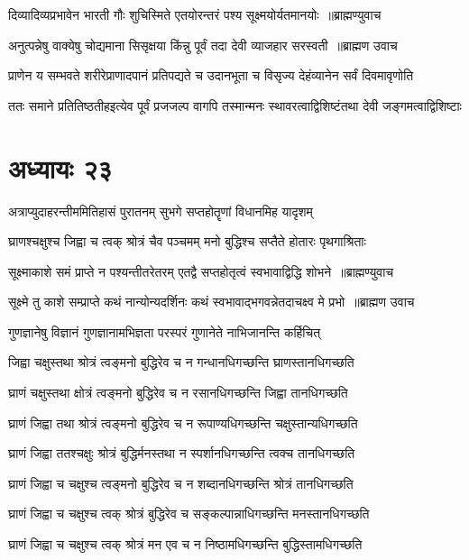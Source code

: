 \threelineshloka
{दिव्यादिव्यप्रभावेन भारती गौः शुचिस्मिते}
{एतयोरन्तरं पश्य सूक्ष्मयोर्यतमानयोः ॥ब्राह्मण्युवाच}
{}


\threelineshloka
{अनुत्पन्नेषु वाक्येषु चोद्यमाना सिसृक्षया}
{किंन्नु पूर्वं तदा देवी व्याजहार सरस्वती ॥ब्राह्मण उवाच}
{}


\twolineshloka
{प्राणेन य सम्भवते शरीरेप्राणादपानं प्रतिपद्यते च}
{उदानभूता च विसृज्य देहंव्यानेन सर्वं दिवमावृणोति}


\twolineshloka
{ततः समाने प्रतितिष्ठतीहइत्येव पूर्वं प्रजजल्प वागपि}
{तस्मान्मनः स्थावरत्वाद्विशिष्टंतथा देवी जङ्गमत्वाद्विशिष्टाः}


\chapter{अध्यायः २३}
\twolineshloka
{अत्राप्युदाहरन्तीममितिहासं पुरातनम्}
{सुभगे सप्तहोतॄणां विधानमिह यादृशम्}


\twolineshloka
{घ्राणश्चक्षुश्च जिह्वा च त्वक् श्रोत्रं चैव पञ्चमम्}
{मनो बुद्धिश्च सप्तैते होतारः पृथगाश्रिताः}


\threelineshloka
{सूक्ष्माकाशे समं प्राप्ते न पश्यन्तीतरेतरम्}
{एतद्वै सप्तहोतृत्वं स्वभावाद्विद्धि शोभने ॥ब्राह्मण्युवाच}
{}


\threelineshloka
{सूक्ष्मे तु काशे सम्प्राप्ते कथं नान्योन्यदर्शिनः}
{कथं स्वभावाद्भगवन्नेतदाचक्ष्व मे प्रभो ॥ब्राह्मण उवाच}
{}


\twolineshloka
{गुणज्ञानेषु विज्ञानं गुणज्ञानामभिज्ञता}
{परस्परं गुणानेते नाभिजानन्ति कर्हिचित्}


\twolineshloka
{जिह्वा चक्षुस्तथा श्रोत्रं त्वङ्मनो बुद्धिरेव च}
{न गन्धानधिगच्छन्ति घ्राणस्तानधिगच्छति}


\twolineshloka
{घ्राणं चक्षुस्तथा क्षोत्रं त्वङ्मनो बुद्धिरेव च}
{न रसानधिगच्छन्ति जिह्वा तानधिगच्छति}


\twolineshloka
{घ्राणं जिह्वा तथा श्रोत्रं त्वङ्मनो बुद्धिरेव च}
{न रूपाण्यधिगच्छन्ति चक्षुस्तान्यधिगच्छति}


\twolineshloka
{घ्राणं जिह्वा ततश्चक्षुः श्रोत्रं बुद्धिर्मनस्तथा}
{न स्पर्शानधिगच्छन्ति त्वक्च तानधिगच्छति}


\twolineshloka
{घ्राणं जिह्वा च चक्षुश्च त्वङ्मनो बुद्धिरेव च}
{न शब्दानधिगच्छन्ति श्रोत्रं तानधिगच्छति}


\twolineshloka
{घ्राणं जिह्वा च चक्षुश्च त्वक् श्रोत्रं बुद्धिरेव च}
{सङ्कल्पान्नाधिगच्छन्ति मनस्तानधिगच्छति}


\twolineshloka
{घ्राणं जिह्वा च चक्षुश्च त्वक् श्रोत्रं मन एव च}
{न निष्ठामधिगच्छन्ति बुद्धिस्तामधिगच्छति}


